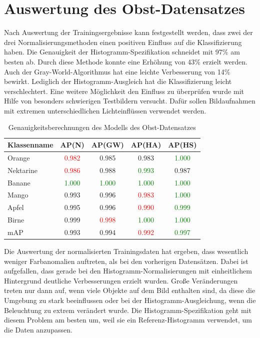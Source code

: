 \section{Auswertung des Obst-Datensatzes}
Nach Auswertung der Trainingsergebnisse kann festgestellt werden, dass zwei der drei Normalisierungsmethoden einen positiven Einfluss auf die Klassifizierung haben. 
Die Genauigkeit der Histogramm-Spezifikation schneidet mit 97\% am besten ab. Durch diese Methode konnte eine Erhöhung von 43\% erzielt werden. Auch der Gray-World-Algorithmus hat eine leichte Verbesserung von 14\% bewirkt. Lediglich der Histogramm-Ausgleich hat die Klassifizierung leicht verschlechtert. Eine weitere Möglichkeit den Einfluss zu überprüfen wurde mit Hilfe von besonders schwierigen Testbildern versucht. Dafür sollen Bildaufnahmen mit extremen unterschiedlichen Lichteinflüssen verwendet werden.
\begin{table}
[h]
\caption{Genauigkeitsberechnungen des Modells des Obst-Datensatzes}
\centering
\begin{tabular}{|l|c|c|c|c|}
\hline
Klassenname & AP(N) & AP(GW) & AP(HA) & AP(HS)\\
\hline
Orange & \textcolor{red}{0.982} & 0.985 & 0.983 & \textcolor{green}{1.000}\\
Nektarine & \textcolor{red}{0.986} & 0.988 & \textcolor{green}{0.993} & 0.987\\
Banane & \textcolor{green}{1.000} & \textcolor{green}{1.000} & \textcolor{green}{1.000} & \textcolor{green}{1.000}\\
Mango & 0.993 & 0.996 & \textcolor{red}{0.983} & \textcolor{green}{1.000}\\
Apfel & 0.995 & 0.996 & \textcolor{red}{0.990} & \textcolor{green}{0.999}\\
Birne & 0.999 & \textcolor{red}{0.998} & \textcolor{green}{1.000} & \textcolor{green}{1.000}\\
\hline
mAP & 0.993 & 0.994 & \textcolor{red}{0.992} & \textcolor{green}{0.997}\\
\hline
\end{tabular}
\end{table}
Die Auswertung der normalisierten Trainingsdaten hat ergeben, dass wesentlich weniger Farbanomalien auftreten, als bei den vorherigen Datensätzen. Dabei ist aufgefallen, dass gerade bei den Histogramm-Normalisierungen mit einheitlichem Hintergrund deutliche Verbesserungen erzielt wurden. Große Veränderungen treten nur dann auf, wenn viele Objekte auf dem Bild enthalten sind, da diese die Umgebung zu stark beeinflussen oder bei der Histogramm-Ausgleichung, wenn die Beleuchtung zu extrem verändert wurde. Die Histogramm-Spezifikation geht mit diesem Problem am besten um, weil sie ein Referenz-Histogramm verwendet, um die Daten anzupassen. \\\\
